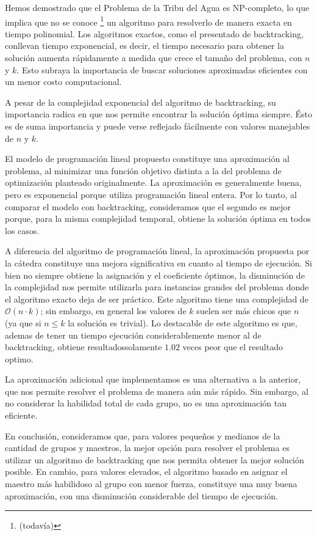 \documentclass{article}
\begin{document}
Hemos demostrado que el Problema de la Tribu del Agua es NP-completo, lo que implica que no se conoce \footnote{(todavía)} un algoritmo para resolverlo de manera exacta en tiempo polinomial. Los algoritmos exactos, como el presentado de backtracking, conllevan tiempo exponencial, es decir, el tiempo necesario para obtener la solución aumenta rápidamente a medida que crece el tamaño del problema, con $n$ y $k$. Esto subraya la importancia de buscar soluciones aproximadas eficientes con un menor costo computacional.

A pesar de la complejidad exponencial del algoritmo de backtracking, su importancia radica en que nos permite encontrar la solución óptima siempre. Ésto es de suma importancia y puede verse reflejado fácilmente con valores manejables de $n$ y $k$.

El modelo de programación lineal propuesto constituye una aproximación al problema, al minimizar una función objetivo distinta a la del problema de optimización planteado originalmente. La aproximación es generalmente buena, pero es exponencial porque utiliza programación lineal entera. Por lo tanto, al comparar el modelo con backtracking, consideramos que el segundo es mejor porque, para la misma complejidad temporal, obtiene la solución óptima en todos los casos. 

A diferencia del algoritmo de programación lineal, la aproximación propuesta por la cátedra constituye una mejora significativa en cuanto al tiempo de ejecución. Si bien no siempre obtiene la asignación y el coeficiente óptimos, la disminución de la complejidad nos permite utilizarla para instancias grandes del problema donde el algoritmo exacto deja de ser práctico.
Este algoritmo tiene una complejidad de $\mathcal{O}(n \cdot k)$; sin embargo, en general los valores de $k$ suelen ser más chicos que $n$ (ya que si $n \leq k$ la solución es trivial). Lo destacable de este algoritmo es que, ademas de tener un tiempo ejecución considerablemente menor al de backtracking, obtiene resultadossolamente $1.02$ veces peor que el resultado optimo.

La aproximación adicional que implementamos es una alternativa a la anterior, que nos permite resolver el problema de manera aún más rápido. Sin embargo, al no considerar la habilidad total de cada grupo, no es una aproximación tan eficiente. 

En conclusión, consideramos que, para valores pequeños y medianos de la cantidad de grupos y maestros, la mejor opción para resolver el problema es utilizar un algoritmo de backtracking que nos permita obtener la mejor solución posible. En cambio, para valores elevados, el algoritmo basado en asignar el maestro más habilidoso al grupo con menor fuerza, constituye una muy buena aproximación, con una disminución considerable del tiempo de ejecución.
\end{document}
